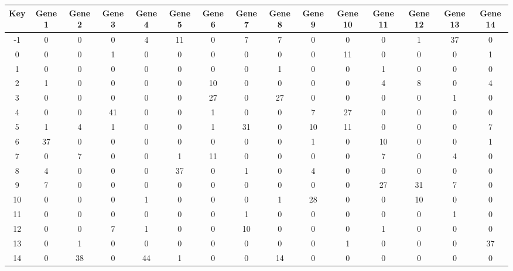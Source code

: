 \begin{tabular}{|c|c|c|c|c|c|c|c|c|c|c|c|c|c|c|}
\hline
Key & Gene 1 & Gene 2 & Gene 3 & Gene 4 & Gene 5 & Gene 6 & Gene 7 & Gene 8 & Gene 9 & Gene 10 & Gene 11 & Gene 12 & Gene 13 & Gene 14 \\
\hline
-1 & 0 & 0 & 0 & 4 & 11 & 0 & 7 & 7 & 0 & 0 & 0 & 1 & 37 & 0 \\
0 & 0 & 0 & 1 & 0 & 0 & 0 & 0 & 0 & 0 & 11 & 0 & 0 & 0 & 1 \\
1 & 0 & 0 & 0 & 0 & 0 & 0 & 0 & 1 & 0 & 0 & 1 & 0 & 0 & 0 \\
2 & 1 & 0 & 0 & 0 & 0 & 10 & 0 & 0 & 0 & 0 & 4 & 8 & 0 & 4 \\
3 & 0 & 0 & 0 & 0 & 0 & 27 & 0 & 27 & 0 & 0 & 0 & 0 & 1 & 0 \\
4 & 0 & 0 & 41 & 0 & 0 & 1 & 0 & 0 & 7 & 27 & 0 & 0 & 0 & 0 \\
5 & 1 & 4 & 1 & 0 & 0 & 1 & 31 & 0 & 10 & 11 & 0 & 0 & 0 & 7 \\
6 & 37 & 0 & 0 & 0 & 0 & 0 & 0 & 0 & 1 & 0 & 10 & 0 & 0 & 1 \\
7 & 0 & 7 & 0 & 0 & 1 & 11 & 0 & 0 & 0 & 0 & 7 & 0 & 4 & 0 \\
8 & 4 & 0 & 0 & 0 & 37 & 0 & 1 & 0 & 4 & 0 & 0 & 0 & 0 & 0 \\
9 & 7 & 0 & 0 & 0 & 0 & 0 & 0 & 0 & 0 & 0 & 27 & 31 & 7 & 0 \\
10 & 0 & 0 & 0 & 1 & 0 & 0 & 0 & 1 & 28 & 0 & 0 & 10 & 0 & 0 \\
11 & 0 & 0 & 0 & 0 & 0 & 0 & 1 & 0 & 0 & 0 & 0 & 0 & 1 & 0 \\
12 & 0 & 0 & 7 & 1 & 0 & 0 & 10 & 0 & 0 & 0 & 1 & 0 & 0 & 0 \\
13 & 0 & 1 & 0 & 0 & 0 & 0 & 0 & 0 & 0 & 1 & 0 & 0 & 0 & 37 \\
14 & 0 & 38 & 0 & 44 & 1 & 0 & 0 & 14 & 0 & 0 & 0 & 0 & 0 & 0 \\
\hline
\end{tabular}